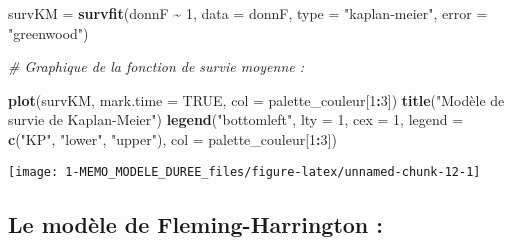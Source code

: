 \documentclass[
]{article}
\newenvironment{Shaded}{\begin{snugshade}}{\end{snugshade}}
\newcommand{\AttributeTok}[1]{\textcolor[rgb]{0.13,0.29,0.53}{#1}}
\newcommand{\CommentTok}[1]{\textcolor[rgb]{0.56,0.35,0.01}{\textit{#1}}}
\newcommand{\ConstantTok}[1]{\textcolor[rgb]{0.56,0.35,0.01}{#1}}
\newcommand{\DecValTok}[1]{\textcolor[rgb]{0.00,0.00,0.81}{#1}}
\newcommand{\FunctionTok}[1]{\textcolor[rgb]{0.13,0.29,0.53}{\textbf{#1}}}
\newcommand{\NormalTok}[1]{#1}
\newcommand{\OtherTok}[1]{\textcolor[rgb]{0.56,0.35,0.01}{#1}}
\newcommand{\SpecialCharTok}[1]{\textcolor[rgb]{0.81,0.36,0.00}{\textbf{#1}}}
\newcommand{\StringTok}[1]{\textcolor[rgb]{0.31,0.60,0.02}{#1}}
\begin{document}
\begin{Shaded}
\begin{Highlighting}[]
\NormalTok{survKM }\OtherTok{=} \FunctionTok{survfit}\NormalTok{(donnF }\SpecialCharTok{\textasciitilde{}} \DecValTok{1}\NormalTok{,}
                 \AttributeTok{data =}\NormalTok{ donnF,}
                 \AttributeTok{type =} \StringTok{"kaplan{-}meier"}\NormalTok{,}
                 \AttributeTok{error =} \StringTok{"greenwood"}\NormalTok{)}

\CommentTok{\# Graphique de la fonction de survie moyenne : }

\FunctionTok{plot}\NormalTok{(survKM, }\AttributeTok{mark.time =} \ConstantTok{TRUE}\NormalTok{, }\AttributeTok{col =}\NormalTok{ palette\_couleur[}\DecValTok{1}\SpecialCharTok{:}\DecValTok{3}\NormalTok{])}
\FunctionTok{title}\NormalTok{(}\StringTok{"Modèle de survie de Kaplan{-}Meier"}\NormalTok{)}
\FunctionTok{legend}\NormalTok{(}\StringTok{"bottomleft"}\NormalTok{,  }
       \AttributeTok{lty =} \DecValTok{1}\NormalTok{,}
       \AttributeTok{cex =} \DecValTok{1}\NormalTok{,}
       \AttributeTok{legend =} \FunctionTok{c}\NormalTok{(}\StringTok{"KP"}\NormalTok{, }\StringTok{"lower"}\NormalTok{, }\StringTok{"upper"}\NormalTok{),}
       \AttributeTok{col =}\NormalTok{ palette\_couleur[}\DecValTok{1}\SpecialCharTok{:}\DecValTok{3}\NormalTok{])}
\end{Highlighting}
\end{Shaded}

\begin{center}\texttt{[image: 1-MEMO\_MODELE\_DUREE\_files/figure-latex/unnamed-chunk-12-1]} \end{center}

\begin{Shaded}
\end{Shaded}

\hypertarget{le-moduxe8le-de-fleming-harrington}{%
\subsection{Le modèle de Fleming-Harrington
:}\label{le-moduxe8le-de-fleming-harrington}}
\end{document}
